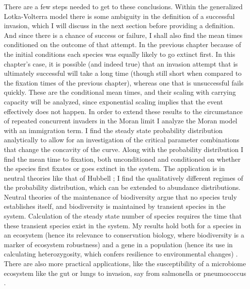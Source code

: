 There are a few steps needed to get to these conclusions. 
Within the generalized Lotka-Volterra model there is some ambiguity in the definition of a successful invasion, which I will discuss in the next section before providing a definition. 
And since there is a chance of success or failure, I shall also find the mean times conditioned on the outcome of that attempt. 
In the previous chapter because of the initial conditions each species was equally likely to go extinct first. 
In this chapter's case, it is possible (and indeed true) that an invasion attempt that is ultimately successful will take a long time (though still short when compared to the fixation times of the previous chapter), whereas one that is unsuccessful fails quickly. 
These are the conditional mean times, and their scaling with carrying capacity will be analyzed, since exponential scaling implies that the event effectively does not happen. 
In order to extend these results to the circumstance of repeated concurrent invaders in the Moran limit I analyze the Moran model with an immigration term. 
I find the steady state probability distribution analytically to allow for an investigation of the critical parameter combinations that change the concavity of the curve. 
Along with the probability distribution I find the mean time to fixation, both unconditioned and conditioned on whether the species first fixates or goes extinct in the system. 
The application is in neutral theories like that of Hubbell \cite{Hubbell2001}; I find the qualitatively different regimes of the probability distribution, which can be extended to abundance distributions. 
Neutral theories of the maintenance of biodiversity argue that no species truly establishes itself, and biodiversity is maintained by transient species in the system. 
Calculation of the steady state number of species requires the time that these transient species exist in the system. 
My results hold both for a species in an ecosystem (hence its relevance to conservation biology, where biodiversity is a marker of ecosystem robustness) \cite{Peterson1997,McKane2003,Green2005,Bickford2007} and a gene in a population (hence its use in calculating heterozygosity, which confers resilience to environmental changes) \cite{Kimura1971,Kawecki2004,Korolev2011,Pennings2014}. 
There are also more practical applications, like the susceptibility of a microbiome ecosystem like the gut or lungs to invasion, say from salmonella or pneumococcus \cite{Kinross2011,Koenig2011,Roeselers2011,Fisher2014a,Theriot2014,Corander2017,Amor2019}. 

